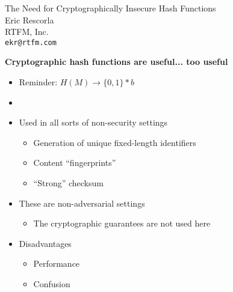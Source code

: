 \documentclass[helvetica]{seminar}
\newcommand{\heading}[1]{%
  \begin{center} 
    \large\bf 
    #1 
  \end{center} 
  \vspace{.4 in}}
\begin{document}
        
\begin{slide}
\begin{center}
\LARGE{{\bf}The Need for Cryptographically Insecure Hash Functions}\\

\vspace{.3 in}
\large{Eric Rescorla}\\
\large{RTFM, Inc.}\\
\large{\texttt{ekr@rtfm.com}}
\end{center}
\end{slide}


\begin{slide}
\heading{Cryptographic hash functions are useful... too useful}

\begin{itemize}
\item Reminder: $H(M) \to \{0,1\}*b$
\item[]
\item Used in all sorts of non-security settings
\begin{itemize}
\item Generation of unique fixed-length identifiers~\cite{reload}
\item Content ``fingerprints''~\cite{rfc4366,fork-loop-fix}
\item ``Strong'' checksum~\cite{http}
\end{itemize}
\item These are non-adversarial settings
\begin{itemize}
\item The cryptographic guarantees are not used here
\end{itemize}
\item Disadvantages
\begin{itemize}
\item Performance
\item Confusion
\end{itemize}
\end{itemize}
\end{slide}
\end{document}
